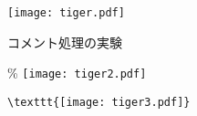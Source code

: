 \documentclass{jsarticle}
\begin{document}
\texttt{[image: tiger.pdf]}

コメント処理の実験 %

\% \texttt{[image: tiger2.pdf]}

\begin{verbatim}
\texttt{[image: tiger3.pdf]}
\end{verbatim}
\end{document}
